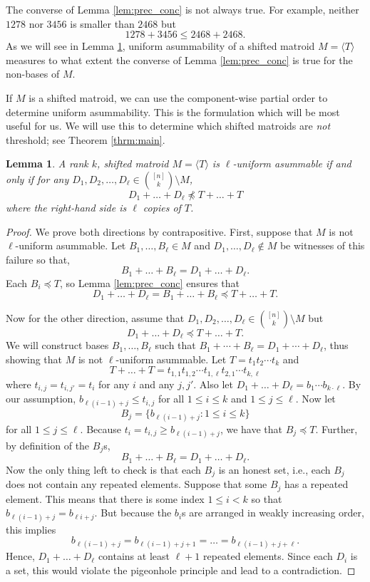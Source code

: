 \documentclass[10pt,a4paper]{amsart}
\theoremstyle{definition}
\theoremstyle{plain}
\newtheorem{lemma}[defn]{Lemma}
\begin{document}
The converse of Lemma \ref{lem:prec_conc} is not always true. For example, neither $1278$ nor $3456$ is smaller than $2468$ but
\[1278 +  3456 \leq 2468 + 2468. \]
As we will see in Lemma \ref{lem:robust_leq}, uniform asummability of a shifted matroid $M=\langle T \rangle$ measures to what extent the converse of Lemma \ref{lem:prec_conc} is true for the non-bases of $M$.

If $M$ is a shifted matroid, we can use the component-wise partial order to determine uniform asummability. This is the formulation which will be most useful for us. We will use this to determine which shifted matroids are \emph{not} threshold; see Theorem \ref{thrm:main}.

\begin{lemma}\label{lem:robust_leq}
  A rank $k$, shifted matroid $M=\langle T\rangle$ is $\ell$-uniform asummable if and only if for any $D_1,D_2,\ldots, D_\ell\in \binom{[n]}{k}\setminus M$,
  \[D_1+ \ldots + D_\ell \npreceq T+ \ldots + T \]
  where the right-hand side is $\ell$ copies of $T$.
\end{lemma}
\begin{proof}
  We prove both directions by contrapositive. First, suppose that $M$ is not $\ell$-uniform asummable. Let $B_1,\ldots,B_\ell\in M$ and $D_1,\ldots,D_\ell\not\in M$ be witnesses of this failure so that, 
  \[B_1+\ldots+B_\ell = D_1+\ldots+D_\ell. \]
  Each $B_i\preceq T$, so Lemma \ref{lem:prec_conc} ensures that 
  \[D_1+ \ldots + D_\ell = B_1+ \ldots + B_\ell \preceq T+ \ldots + T. \]
  
  \noindent Now for the other direction, assume that $D_1,D_2,\ldots, D_\ell \in \binom{[n]}{k}\setminus M$ but 
    \[ D_1+ \ldots + D_\ell  \preceq T+ \ldots + T. \]
   We will construct bases $B_1,\ldots, B_\ell$ such that $B_1+\cdots + B_\ell = D_1+ \cdots + D_\ell$, thus showing that $M$ is not $\ell$-uniform asummable. Let $T= t_1 t_2 \cdots t_k$ and 
   \[T+\ldots + T = t_{1,1}t_{1,2}\cdots t_{1,\ell}t_{2,1}\cdots t_{k,\ell}\]
    where $t_{i,j}=t_{i,j'}=t_i$ for any $i$ and any $j,j'$. Also let $D_1+\ldots + D_\ell = b_{1}\cdots b_{k\cdot\ell}$. By our assumption, $b_{\ell (i-1) + j}\leq t_{i,j}$ for all $1\leq i\leq k$ and $1\leq j \leq \ell$. Now let
    \[ B_j = \{ b_{\ell (i-1) + j}: 1\leq i \leq k\}\]
    for all $1\leq j \leq \ell$. Because $t_i=t_{i,j}\geq  b_{\ell (i-1) + j}$, we have that $B_j\preceq T$. Further, by definition of the $B_j$s,
    \[B_1+\ldots + B_\ell = D_1+\ldots +D_\ell.\]
    Now the only thing left to check is that each $B_j$ is an honest set, i.e., each $B_{j}$ does not contain any repeated elements. Suppose that some $B_j$ has a repeated element. This means that there is some index $1\leq i < k$ so that $b_{\ell (i-1) +j} = b_{\ell i +j}$. But because the $b_i$s are arranged in weakly increasing order, this implies
    \[b_{\ell(i-1)+j} = b_{\ell(i-1)+j+1} = \ldots = b_{\ell(i-1)+j+\ell}. \]
    Hence, $D_1+\ldots+ D_\ell$ contains at least $\ell+1$ repeated elements. Since each $D_i$ is a set, this would violate the pigeonhole principle and lead to a contradiction.
\end{proof}
\end{document}
